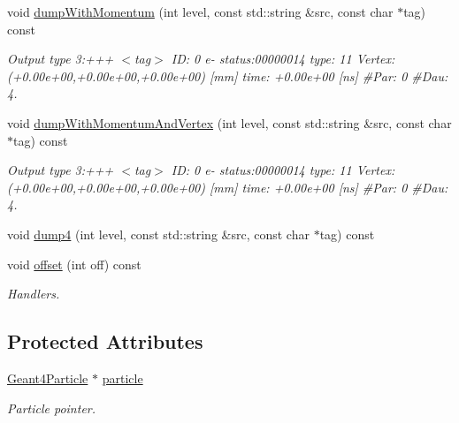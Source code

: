 \begin{DoxyCompactItemize}
void \hyperlink{class_d_d4hep_1_1_simulation_1_1_geant4_particle_handle_a24105ffb9552c45d007786a8cd63899b}{dump\+With\+Momentum} (int level, const std\+::string \&src, const char $\ast$tag) const
\begin{DoxyCompactList}\small\item\em Output type 3\+:+++ $<$tag$>$ ID\+: 0 e-\/ status\+:00000014 type\+: 11 Vertex\+:(+0.00e+00,+0.00e+00,+0.00e+00) \mbox{[}mm\mbox{]} time\+: +0.00e+00 \mbox{[}ns\mbox{]} \#Par\+: 0 \#Dau\+: 4. \end{DoxyCompactList}\item 
void \hyperlink{class_d_d4hep_1_1_simulation_1_1_geant4_particle_handle_a2ae8725058b13c12872b5c59607a62e6}{dump\+With\+Momentum\+And\+Vertex} (int level, const std\+::string \&src, const char $\ast$tag) const
\begin{DoxyCompactList}\small\item\em Output type 3\+:+++ $<$tag$>$ ID\+: 0 e-\/ status\+:00000014 type\+: 11 Vertex\+:(+0.00e+00,+0.00e+00,+0.00e+00) \mbox{[}mm\mbox{]} time\+: +0.00e+00 \mbox{[}ns\mbox{]} \#Par\+: 0 \#Dau\+: 4. \end{DoxyCompactList}\item 
void \hyperlink{class_d_d4hep_1_1_simulation_1_1_geant4_particle_handle_ae1c9a4f9265e692704b8eeadac65f7e4}{dump4} (int level, const std\+::string \&src, const char $\ast$tag) const
\item 
void \hyperlink{class_d_d4hep_1_1_simulation_1_1_geant4_particle_handle_a8a878f870705068d67cdc051f09257ad}{offset} (int off) const
\begin{DoxyCompactList}\small\item\em Handlers. \end{DoxyCompactList}\end{DoxyCompactItemize}
\subsection*{Protected Attributes}
\begin{DoxyCompactItemize}
\item 
\hyperlink{class_d_d4hep_1_1_simulation_1_1_geant4_particle}{Geant4\+Particle} $\ast$ \hyperlink{class_d_d4hep_1_1_simulation_1_1_geant4_particle_handle_ad7a732832f8fe7f74c8fdb4cff5baced}{particle}
\begin{DoxyCompactList}\small\item\em Particle pointer. \end{DoxyCompactList}\end{DoxyCompactItemize}


